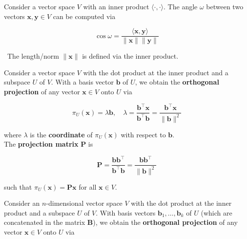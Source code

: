 \documentclass[10pt,a4paper]{Template}
\begin{document}
\begin{minipage}{0.48\textwidth}
\divider


Consider a vector space $V$ with an inner product $\langle\cdot, \cdot\rangle$. The angle $\omega$ between two vectors $\boldsymbol{x}, \boldsymbol{y} \in V$ can be computed via

\[
\cos \omega=\frac{\langle\boldsymbol{x}, \boldsymbol{y}\rangle}{\|\boldsymbol{x}\|\|\boldsymbol{y}\|}
\]

{\small \faLightbulb} \ The length/norm $\|\boldsymbol{x}\|$ is defined via the inner product.

\vspace{0.5cm}

\end{minipage}
\hfill
\begin{minipage}{0.48\textwidth}

\vspace{-1.8cm}

\topic[Projections]

Consider a vector space $V$ with the dot product at the inner product and a subspace $U$ of $V$. With a basis vector $\boldsymbol{b}$ of $U$, we obtain the \textbf{orthogonal projection} of any vector $\boldsymbol{x} \in V$ onto $U$ via

\[
\pi_{U}(\boldsymbol{x})=\lambda \boldsymbol{b}, \quad \lambda=\frac{\boldsymbol{b}^{\top} \boldsymbol{x}}{\boldsymbol{b}^{\top} \boldsymbol{b}}=\frac{\boldsymbol{b}^{\top} \boldsymbol{x}}{\|\boldsymbol{b}\|^{2}}
\]

where $\lambda$ is the \textbf{coordinate} of $\pi_{U}(\boldsymbol{x})$ with respect to $\boldsymbol{b}$. \\
The \textbf{projection matrix} $\boldsymbol{P}$ is

\[
\boldsymbol{P}=\frac{\boldsymbol{b} \boldsymbol{b}^{\top}}{\boldsymbol{b}^{\top} \boldsymbol{b}}=\frac{\boldsymbol{b} \boldsymbol{b}^{\top}}{\|\boldsymbol{b}\|^{2}}
\]

such that $\pi_{U}(\boldsymbol{x})=\boldsymbol{P} \boldsymbol{x}$ for all $\boldsymbol{x} \in V$.

\divider 


Consider an $n$-dimensional vector space $V$ with the dot product at the inner product and a subspace $U$ of $V$. With basis vectors $\boldsymbol{b}_{1}, \ldots, \boldsymbol{b}_{k}$ of $U$ (which are concatenated in the matrix $\boldsymbol{B}$), we obtain the \textbf{orthogonal projection} of any vector $\boldsymbol{x} \in V$ onto $U$ via


\end{minipage}
\end{document}
